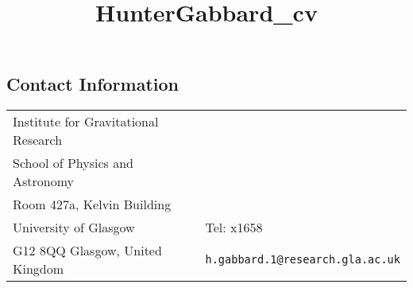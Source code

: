\documentclass[margin,line,pifont,palatino,courier]{res}
\begin{document}
\title{HunterGabbard_cv}
\begin{resume}

\section{\sc Contact Information}

\vspace{.05in}
\begin{tabular}{@{}p{2.75in}p{2in}}
Institute for Gravitational Research\\
School of Physics and Astronomy\\
Room 427a, Kelvin Building\\
University of Glasgow  & Tel: x1658 \\
G12 8QQ Glasgow, United Kingdom & \verb+h.gabbard.1@research.gla.ac.uk+\\
\end{tabular}










\end{resume}
\end{document}
